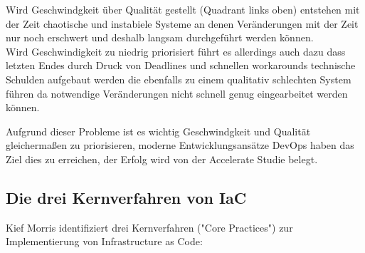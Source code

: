 Wird Geschwindgkeit über Qualität gestellt (Quadrant links oben) entstehen
mit der Zeit chaotische und instabiele Systeme an denen Veränderungen mit
der Zeit nur noch erschwert und deshalb langsam durchgeführt werden können.\\
Wird Geschwindigkeit zu niedrig priorisiert führt es allerdings auch dazu
dass letzten Endes durch Druck von Deadlines und schnellen workarounds
technische Schulden aufgebaut werden die ebenfalls zu einem qualitativ
schlechten System führen da notwendige Veränderungen nicht schnell genug
eingearbeitet werden können.

Aufgrund dieser Probleme ist es wichtig Geschwindgkeit und Qualität
gleichermaßen zu priorisieren, moderne Entwicklungsansätze DevOps
haben das Ziel dies zu erreichen, der Erfolg wird von der
Accelerate Studie belegt.

\subsection{Die drei Kernverfahren von IaC}

Kief Morris identifiziert drei Kernverfahren ("Core Practices")
zur Implementierung von Infrastructure as Code:

